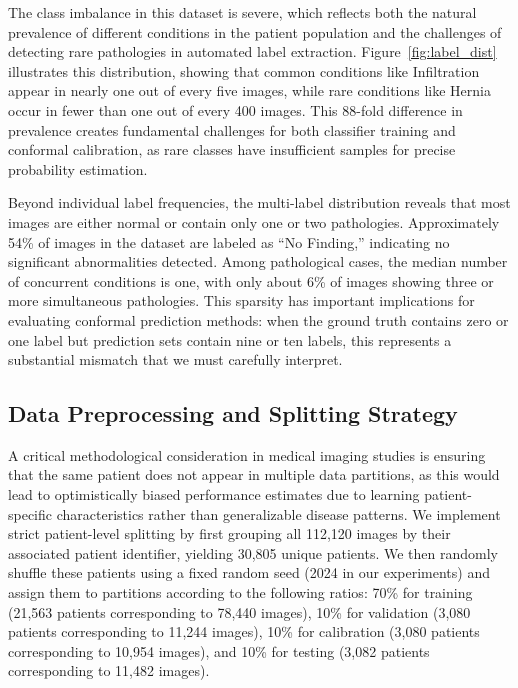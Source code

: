 The class imbalance in this dataset is severe, which reflects both the natural prevalence of different conditions in the patient population and the challenges of detecting rare pathologies in automated label extraction.
Figure~\ref{fig:label_dist} illustrates this distribution, showing that common conditions like Infiltration appear in nearly one out of every five images, while rare conditions like Hernia occur in fewer than one out of every 400 images.
This 88-fold difference in prevalence creates fundamental challenges for both classifier training and conformal calibration, as rare classes have insufficient samples for precise probability estimation.

Beyond individual label frequencies, the multi-label distribution reveals that most images are either normal or contain only one or two pathologies.
Approximately 54\% of images in the dataset are labeled as ``No Finding,'' indicating no significant abnormalities detected.
Among pathological cases, the median number of concurrent conditions is one, with only about 6\% of images showing three or more simultaneous pathologies.
This sparsity has important implications for evaluating conformal prediction methods: when the ground truth contains zero or one label but prediction sets contain nine or ten labels, this represents a substantial mismatch that we must carefully interpret.

\subsection{Data Preprocessing and Splitting Strategy}
\label{subsec:data-preprocessing-and-splitting-strategy}

A critical methodological consideration in medical imaging studies is ensuring that the same patient does not appear in multiple data partitions, as this would lead to optimistically biased performance estimates due to learning patient-specific characteristics rather than generalizable disease patterns.
We implement strict patient-level splitting by first grouping all 112,120 images by their associated patient identifier, yielding 30,805 unique patients.
We then randomly shuffle these patients using a fixed random seed (2024 in our experiments) and assign them to partitions according to the following ratios: 70\% for training (21,563 patients corresponding to 78,440 images), 10\% for validation (3,080 patients corresponding to 11,244 images), 10\% for calibration (3,080 patients corresponding to 10,954 images), and 10\% for testing (3,082 patients corresponding to 11,482 images).

